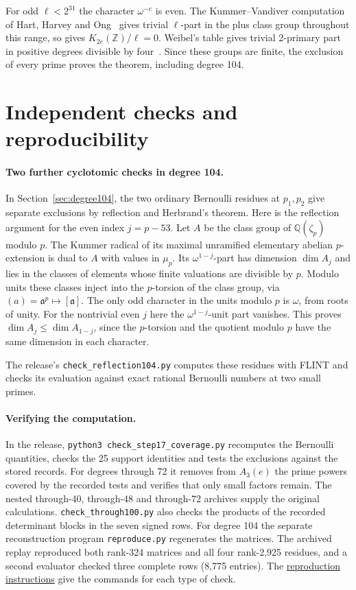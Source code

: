\documentclass[11pt,a4paper]{article}
\newcommand{\Q}{\mathbb Q}
\newcommand{\Z}{\mathbb Z}
\begin{document}
For odd \(\ell<2^{31}\) the character \(\omega^{-e}\) is even.
The Kummer--Vandiver computation of Hart, Harvey and Ong~\cite{hho}
gives trivial \(\ell\)-part in the plus class group throughout this range,
so \cite[Thm.~5.1]{jkpsz} gives \(K_{2e}(\Z)/\ell=0\).
Weibel's table gives trivial 2-primary part in positive degrees divisible
by four~\cite[VI, Cor.~9.8]{weibel}. Since these groups are finite,
the exclusion of every prime proves the theorem, including degree 104.

\newpage
\section{Independent checks and reproducibility}
\paragraph{Two further cyclotomic checks in degree 104.}
In Section~\ref{sec:degree104}, the two ordinary Bernoulli residues at
\(p_1,p_2\) give separate exclusions by reflection and Herbrand's theorem.
Here is the reflection argument for the even index \(j=p-53\). Let \(A\) be the class group of \(\Q(\zeta_p)\) modulo \(p\).
The Kummer radical of its maximal unramified elementary abelian \(p\)-extension
is dual to \(A\) with values in \(\mu_p\). Its \(\omega^{1-j}\)-part has
dimension \(\dim A_{j}\) and lies in the classes of elements whose finite
valuations are divisible by \(p\). Modulo units these classes inject into
the \(p\)-torsion of the class group, via \((a)=\mathfrak a^p\mapsto[\mathfrak a]\).
The only odd character in the units modulo \(p\) is \(\omega\), from roots
of unity. For the nontrivial even \(j\) here the \(\omega^{1-j}\)-unit part
vanishes. This proves \(\dim A_j\leq\dim A_{1-j}\), since the \(p\)-torsion
and the quotient modulo \(p\) have the same dimension in each character.

The release's \texttt{check\_reflection104.py} computes these residues with
FLINT and checks its evaluation against exact rational Bernoulli numbers
at two small primes.

\paragraph{Verifying the computation.}
In the release, \texttt{python3 check\_step17\_coverage.py} recomputes the
Bernoulli quantities, checks the 25 support identities and tests the
exclusions against the stored records. For degrees through 72 it removes
from \(A_3(e)\) the prime powers covered by the recorded tests and verifies
that only small factors remain. The nested through-40, through-48 and
through-72 archives supply the original calculations.
\texttt{check\_through100.py} also checks the products of the recorded
determinant blocks in the seven signed rows.
For degree 104 the separate reconstruction program \texttt{reproduce.py}
regenerates the matrices. The archived replay reproduced both rank-324
matrices and all four rank-2,925 residues, and a second evaluator checked
three complete rows (8,775 entries).
The \href{https://github.com/leopintar05/hecke-k-theory-104/blob/v5/REPRODUCE.md}{reproduction instructions}
give the commands for each type of check.
\end{document}
